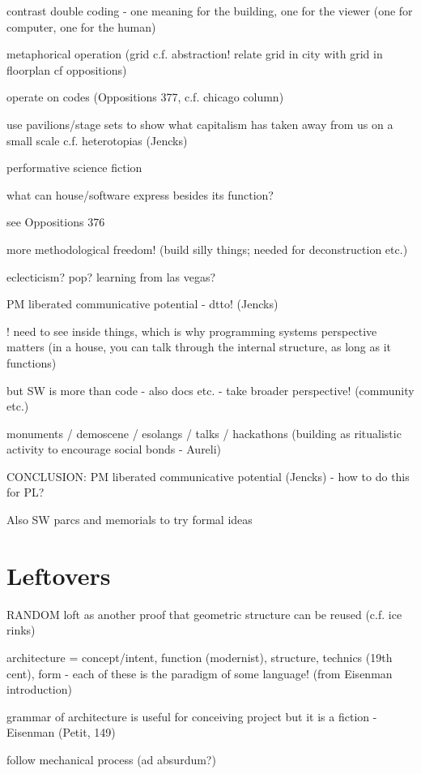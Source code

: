 contrast double coding - one meaning for the building, one for the viewer
(one for computer, one for the human)

metaphorical operation (grid c.f. abstraction!
  relate grid in city with grid in floorplan cf oppositions)

operate on codes (Oppositions 377, c.f. chicago column)

use pavilions/stage sets to show what capitalism has
taken away from us on a small scale
c.f. heterotopias (Jencks)

performative science fiction

what can house/software express besides its function?

see Oppositions 376

more methodological freedom!
(build silly things; needed for deconstruction etc.)

eclecticism? pop? learning from las vegas?

PM liberated communicative potential - dtto! (Jencks)

! need to see inside things, which is why programming systems perspective matters
(in a house, you can talk through the internal structure, as long as it functions)

but SW is more than code - also docs etc. - take broader perspective!
(community etc.)

monuments / demoscene / esolangs / talks / hackathons
(building as ritualistic activity to encourage social bonds - Aureli)

CONCLUSION: PM liberated communicative potential (Jencks) - how to do this for PL?

Also SW parcs and memorials to try formal ideas



\section{Leftovers}

RANDOM
loft as another proof that geometric structure can be reused (c.f. ice rinks)

architecture = concept/intent, function (modernist), structure, technics (19th cent), form
- each of these is the paradigm of some language!
(from Eisenman introduction)

grammar of architecture is useful for conceiving project but it is a fiction - Eisenman (Petit, 149)

follow mechanical process (ad absurdum?)

